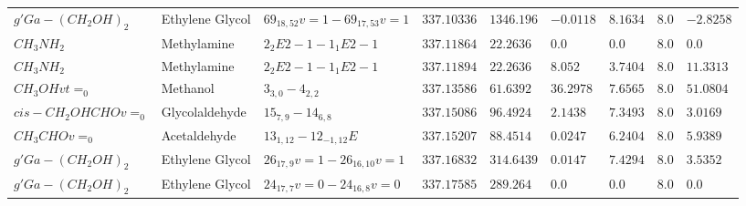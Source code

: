 \documentclass[10pt]{article}
\begin{document}
\begin{table}[htb]
\begin{tabular}{l l l l l l l l l}
$g'Ga-(CH_{2}OH)_{2}$ & Ethylene Glycol & $69_{18,52}v=1-69_{17,53}v=1$ & $337.10336$ & $1346.196$ & $-0.0118$ & $8.1634$ & $8.0$ & $-2.8258$\\
$CH_{3}NH_{2}$ & Methylamine & $2_{2}E2-1-1_{1}E2-1$ & $337.11864$ & $22.2636$ & $0.0$ & $0.0$ & $8.0$ & $0.0$\\
$CH_{3}NH_{2}$ & Methylamine & $2_{2}E2-1-1_{1}E2-1$ & $337.11894$ & $22.2636$ & $8.052$ & $3.7404$ & $8.0$ & $11.3313$\\
$CH_{3}OHvt=_{0}$ & Methanol & $3_{3,0}-4_{2,2}$ & $337.13586$ & $61.6392$ & $36.2978$ & $7.6565$ & $8.0$ & $51.0804$\\
$cis-CH_{2}OHCHOv=_{0}$ & Glycolaldehyde & $15_{7,9}-14_{6,8}$ & $337.15086$ & $96.4924$ & $2.1438$ & $7.3493$ & $8.0$ & $3.0169$\\
$CH_{3}CHOv=_{0}$ & Acetaldehyde & $13_{1,12}-12_{-1,12}E$ & $337.15207$ & $88.4514$ & $0.0247$ & $6.2404$ & $8.0$ & $5.9389$\\
$g'Ga-(CH_{2}OH)_{2}$ & Ethylene Glycol & $26_{17,9}v=1-26_{16,10}v=1$ & $337.16832$ & $314.6439$ & $0.0147$ & $7.4294$ & $8.0$ & $3.5352$\\
$g'Ga-(CH_{2}OH)_{2}$ & Ethylene Glycol & $24_{17,7}v=0-24_{16,8}v=0$ & $337.17585$ & $289.264$ & $0.0$ & $0.0$ & $8.0$ & $0.0$\\
\hline

    \end{tabular}
\end{table}
\end{document}
